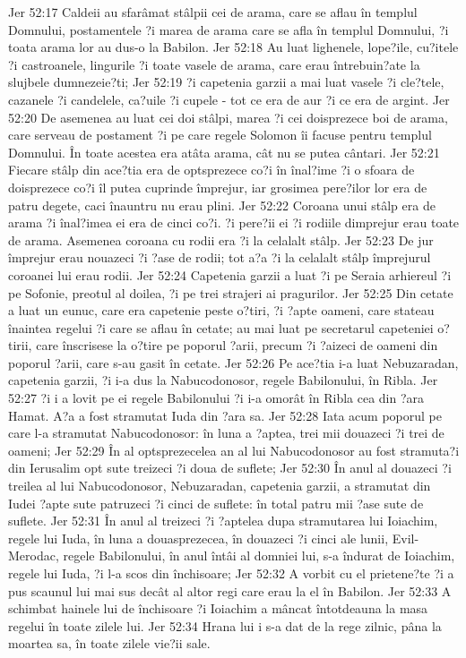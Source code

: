 Jer 52:17  Caldeii au sfarâmat stâlpii cei de arama, care se aflau în templul Domnului, postamentele ?i marea de arama care se afla în templul Domnului, ?i toata arama lor au dus-o la Babilon.
Jer 52:18  Au luat lighenele, lope?ile, cu?itele ?i castroanele, lingurile ?i toate vasele de arama, care erau întrebuin?ate la slujbele dumnezeie?ti;
Jer 52:19  ?i capetenia garzii a mai luat vasele ?i cle?tele, cazanele ?i candelele, ca?uile ?i cupele - tot ce era de aur ?i ce era de argint.
Jer 52:20  De asemenea au luat cei doi stâlpi, marea ?i cei doisprezece boi de arama, care serveau de postament ?i pe care regele Solomon îi facuse pentru templul Domnului. În toate acestea era atâta arama, cât nu se putea cântari.
Jer 52:21  Fiecare stâlp din ace?tia era de optsprezece co?i în înal?ime ?i o sfoara de doisprezece co?i îl putea cuprinde împrejur, iar grosimea pere?ilor lor era de patru degete, caci înauntru nu erau plini.
Jer 52:22  Coroana unui stâlp era de arama ?i înal?imea ei era de cinci co?i. ?i pere?ii ei ?i rodiile dimprejur erau toate de arama. Asemenea coroana cu rodii era ?i la celalalt stâlp.
Jer 52:23  De jur împrejur erau nouazeci ?i ?ase de rodii; tot a?a ?i la celalalt stâlp împrejurul coroanei lui erau rodii.
Jer 52:24  Capetenia garzii a luat ?i pe Seraia arhiereul ?i pe Sofonie, preotul al doilea, ?i pe trei strajeri ai pragurilor.
Jer 52:25  Din cetate a luat un eunuc, care era capetenie peste o?tiri, ?i ?apte oameni, care stateau înaintea regelui ?i care se aflau în cetate; au mai luat pe secretarul capeteniei o?tirii, care înscrisese la o?tire pe poporul ?arii, precum ?i ?aizeci de oameni din poporul ?arii, care s-au gasit în cetate.
Jer 52:26  Pe ace?tia i-a luat Nebuzaradan, capetenia garzii, ?i i-a dus la Nabucodonosor, regele Babilonului, în Ribla.
Jer 52:27  ?i i a lovit pe ei regele Babilonului ?i i-a omorât în Ribla cea din ?ara Hamat. A?a a fost stramutat Iuda din ?ara sa.
Jer 52:28  Iata acum poporul pe care l-a stramutat Nabucodonosor: în luna a ?aptea, trei mii douazeci ?i trei de oameni;
Jer 52:29  În al optsprezecelea an al lui Nabucodonosor au fost stramuta?i din Ierusalim opt sute treizeci ?i doua de suflete;
Jer 52:30  În anul al douazeci ?i treilea al lui Nabucodonosor, Nebuzaradan, capetenia garzii, a stramutat din Iudei ?apte sute patruzeci ?i cinci de suflete: în total patru mii ?ase sute de suflete.
Jer 52:31  În anul al treizeci ?i ?aptelea dupa stramutarea lui Ioiachim, regele lui Iuda, în luna a douasprezecea, în douazeci ?i cinci ale lunii, Evil-Merodac, regele Babilonului, în anul întâi al domniei lui, s-a îndurat de Ioiachim, regele lui Iuda, ?i l-a scos din închisoare;
Jer 52:32  A vorbit cu el prietene?te ?i a pus scaunul lui mai sus decât al altor regi care erau la el în Babilon.
Jer 52:33  A schimbat hainele lui de închisoare ?i Ioiachim a mâncat întotdeauna la masa regelui în toate zilele lui.
Jer 52:34  Hrana lui i s-a dat de la rege zilnic, pâna la moartea sa, în toate zilele vie?ii sale.


